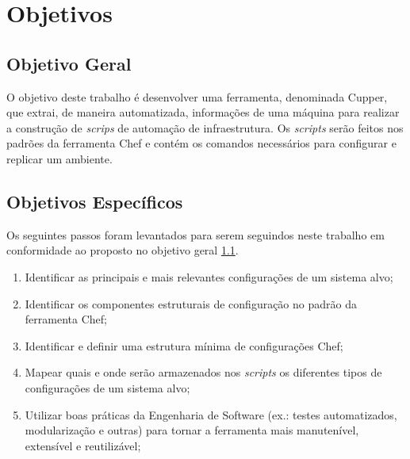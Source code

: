 \section{Objetivos}
\label{sec:obj}

\subsection{Objetivo Geral}
\label{sec:obj-grl}

O objetivo deste trabalho é desenvolver uma ferramenta, denominada Cupper,
que extrai, de maneira automatizada, informações de uma máquina para realizar
a construção de \textit{scrips} de automação de infraestrutura. Os \textit{scripts}
serão feitos nos padrões da ferramenta Chef e contém os comandos
necessários para configurar e replicar um ambiente.

\subsection{Objetivos Específicos}
\label{sec:obj-esp}

Os seguintes passos foram levantados para serem seguindos neste trabalho
em conformidade ao proposto no objetivo geral \ref{sec:obj-grl}.

\begin{enumerate}
  \item Identificar as principais e mais relevantes configurações de um sistema
    alvo;
  \item Identificar os componentes estruturais de configuração no padrão da
    ferramenta Chef;
  \item Identificar e definir uma estrutura mínima de configurações Chef;
  \item Mapear quais e onde serão armazenados nos \textit{scripts} os
    diferentes tipos de configurações de um sistema alvo;
  \item Utilizar boas práticas da Engenharia de Software (ex.: testes
    automatizados, modularização e outras) para tornar a ferramenta mais
    manutenível, extensível e reutilizável;
\end{enumerate}
